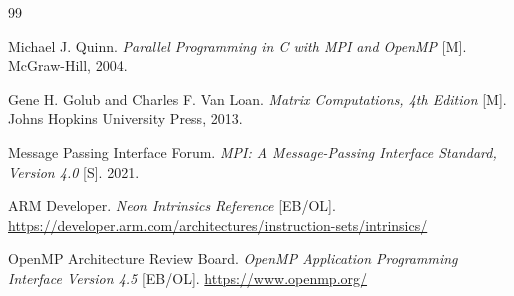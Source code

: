 \documentclass[a4paper]{article}
\begin{document}
\renewcommand{\refname}{参考文献}
\begin{thebibliography}{99}

Michael J. Quinn.
\textit{Parallel Programming in C with MPI and OpenMP} [M].
McGraw-Hill, 2004.

Gene H. Golub and Charles F. Van Loan.
\textit{Matrix Computations, 4th Edition} [M].
Johns Hopkins University Press, 2013.

Message Passing Interface Forum.
\textit{MPI: A Message-Passing Interface Standard, Version 4.0} [S].
2021.

ARM Developer.
\textit{Neon Intrinsics Reference} [EB/OL].
\url{https://developer.arm.com/architectures/instruction-sets/intrinsics/}

OpenMP Architecture Review Board.
\textit{OpenMP Application Programming Interface Version 4.5} [EB/OL].
\url{https://www.openmp.org/}

\end{thebibliography}
\end{document}
